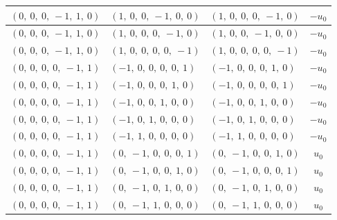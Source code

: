 \documentclass[11pt]{article}
\theoremstyle{definition}
\begin{document}
\begin{longtable}{|l|l|l|c|}
    \hline
    $\left( 0, \  0, \  0, \  -1, \  1, \  0\right)$ & $\left( 1, \  0, \  0, \  -1, \  0, \  0\right)$ & $\left( 1, \  0, \  0, \  0, \  -1, \  0\right)$ & $- u_{0}$ \\
    \hline
    $\left( 0, \  0, \  0, \  -1, \  1, \  0\right)$ & $\left( 1, \  0, \  0, \  0, \  -1, \  0\right)$ & $\left( 1, \  0, \  0, \  -1, \  0, \  0\right)$ & $- u_{0}$ \\
    \hline
    $\left( 0, \  0, \  0, \  -1, \  1, \  0\right)$ & $\left( 1, \  0, \  0, \  0, \  0, \  -1\right)$ & $\left( 1, \  0, \  0, \  0, \  0, \  -1\right)$ & $- u_{0}$ \\
    \hline
    $\left( 0, \  0, \  0, \  0, \  -1, \  1\right)$ & $\left( -1, \  0, \  0, \  0, \  0, \  1\right)$ & $\left( -1, \  0, \  0, \  0, \  1, \  0\right)$ & $- u_{0}$ \\
    \hline
    $\left( 0, \  0, \  0, \  0, \  -1, \  1\right)$ & $\left( -1, \  0, \  0, \  0, \  1, \  0\right)$ & $\left( -1, \  0, \  0, \  0, \  0, \  1\right)$ & $- u_{0}$ \\
    \hline
    $\left( 0, \  0, \  0, \  0, \  -1, \  1\right)$ & $\left( -1, \  0, \  0, \  1, \  0, \  0\right)$ & $\left( -1, \  0, \  0, \  1, \  0, \  0\right)$ & $- u_{0}$ \\
    \hline
    $\left( 0, \  0, \  0, \  0, \  -1, \  1\right)$ & $\left( -1, \  0, \  1, \  0, \  0, \  0\right)$ & $\left( -1, \  0, \  1, \  0, \  0, \  0\right)$ & $- u_{0}$ \\
    \hline
    $\left( 0, \  0, \  0, \  0, \  -1, \  1\right)$ & $\left( -1, \  1, \  0, \  0, \  0, \  0\right)$ & $\left( -1, \  1, \  0, \  0, \  0, \  0\right)$ & $- u_{0}$ \\
    \hline
    $\left( 0, \  0, \  0, \  0, \  -1, \  1\right)$ & $\left( 0, \  -1, \  0, \  0, \  0, \  1\right)$ & $\left( 0, \  -1, \  0, \  0, \  1, \  0\right)$ & $u_{0}$ \\
    \hline
    $\left( 0, \  0, \  0, \  0, \  -1, \  1\right)$ & $\left( 0, \  -1, \  0, \  0, \  1, \  0\right)$ & $\left( 0, \  -1, \  0, \  0, \  0, \  1\right)$ & $u_{0}$ \\
    \hline
    $\left( 0, \  0, \  0, \  0, \  -1, \  1\right)$ & $\left( 0, \  -1, \  0, \  1, \  0, \  0\right)$ & $\left( 0, \  -1, \  0, \  1, \  0, \  0\right)$ & $u_{0}$ \\
    \hline
    $\left( 0, \  0, \  0, \  0, \  -1, \  1\right)$ & $\left( 0, \  -1, \  1, \  0, \  0, \  0\right)$ & $\left( 0, \  -1, \  1, \  0, \  0, \  0\right)$ & $u_{0}$ \\

\end{longtable}
\end{document}

